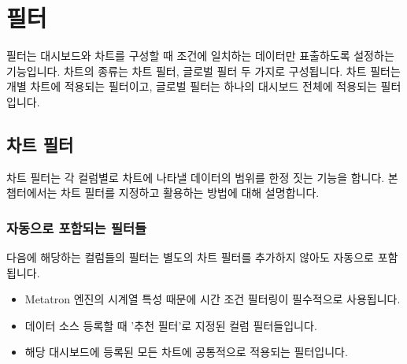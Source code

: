\documentclass[letterpaper,10pt,english]{sphinxmanual}
\begin{document}
\section{필터}
\label{\detokenize{discovery/part04/filters:id1}}\label{\detokenize{discovery/part04/filters::doc}}
필터는 대시보드와 차트를 구성할 때 조건에 일치하는 데이터만 표출하도록 설정하는 기능입니다. 차트의 종류는 차트 필터, 글로벌 필터 두 가지로 구성됩니다. 차트 필터는 개별 차트에 적용되는 필터이고, 글로벌 필터는 하나의 대시보드 전체에 적용되는 필터입니다.


\subsection{차트 필터}
\label{\detokenize{discovery/part04/chart_filter:id1}}\label{\detokenize{discovery/part04/chart_filter::doc}}
차트 필터는 각 컬럼별로 차트에 나타낼 데이터의 범위를 한정 짓는 기능을 합니다. 본 챕터에서는 차트 필터를 지정하고 활용하는 방법에 대해 설명합니다.


\subsubsection{자동으로 포함되는 필터들}
\label{\detokenize{discovery/part04/chart_filter:id2}}
다음에 해당하는 컬럼들의 필터는 별도의 차트 필터를 추가하지 않아도 자동으로 포함됩니다.
\begin{itemize}
\item {} 
 Metatron 엔진의 시계열 특성 때문에 시간 조건 필터링이 필수적으로 사용됩니다.

\item {} 
 데이터 소스 등록할 때 '추천 필터'로 지정된 컬럼 필터들입니다.

\item {} 
 해당 대시보드에 등록된 모든 차트에 공통적으로 적용되는 필터입니다.

\end{itemize}
\end{document}
